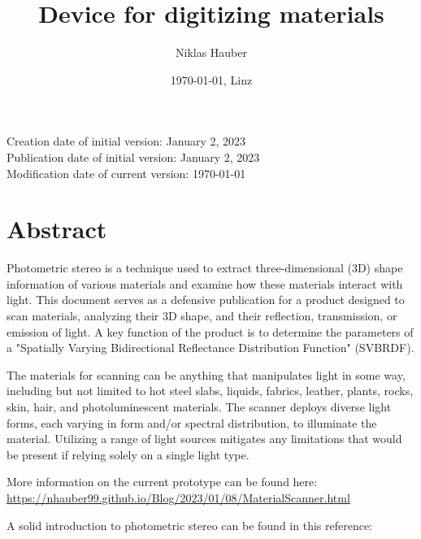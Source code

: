 \documentclass[11pt, twoside, listof=totocnumbered, bibliography=totocnumbered]{scrartcl}
\title{Device for digitizing materials}
\author{Niklas Hauber}
\date{\today{}, Linz}
\begin{document}
\maketitle
Creation date of initial version: January 2, 2023\\
Publication date of initial version: January 2, 2023\\
Modification date of current version: \today{}\\

\section{Abstract}
Photometric stereo is a technique used to extract three-dimensional (3D) shape information of various materials and examine how these materials interact with light. This document serves as a defensive publication for a product designed to scan materials, analyzing their 3D shape, and their reflection, transmission, or emission of light. A key function of the product is to determine the parameters of a "Spatially Varying Bidirectional Reflectance Distribution Function" (SVBRDF).

The materials for scanning can be anything that manipulates light in some way, including but not limited to hot steel slabs, liquids, fabrics, leather, plants, rocks, skin, hair, and photoluminescent materials. The scanner deploys diverse light forms, each varying in form and/or spectral distribution, to illuminate the material. Utilizing a range of light sources mitigates any limitations that would be present if relying solely on a single light type. \cite{SURVEY}

More information on the current prototype can be found here: \\
\href{https://nhauber99.github.io/Blog/2023/01/08/MaterialScanner.html}{https://nhauber99.github.io/Blog/2023/01/08/MaterialScanner.html}

A solid introduction to photometric stereo can be found in this reference: \cite{SURVEY}
\end{document}

